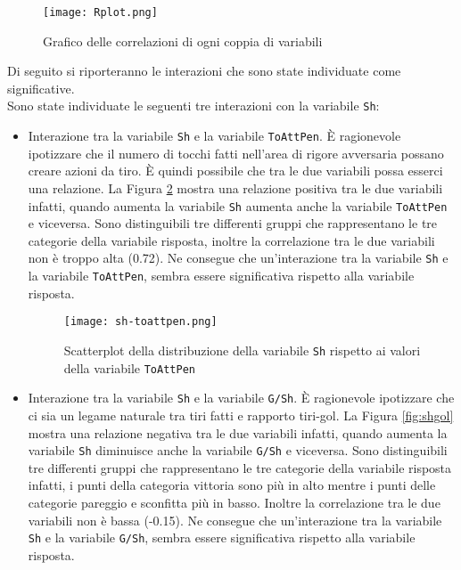\begin{figure}[htbp]
	\begin{center}
		\texttt{[image: Rplot.png]}
		\caption{Grafico delle correlazioni di ogni coppia di variabili}  \label{fig:cor}
	\end{center}
\end{figure}

Di seguito si riporteranno le interazioni che sono state individuate come significative.\\ 


Sono state individuate le seguenti tre interazioni con la variabile \texttt{Sh}:
\begin{itemize}
	\item Interazione tra la variabile \texttt{Sh} e la variabile \texttt{ToAttPen}. È ragionevole ipotizzare che il numero di tocchi fatti nell'area di rigore avversaria possano creare azioni da tiro. È quindi possibile che tra le due variabili possa esserci una relazione. La Figura \ref{fig:shpen} mostra una relazione  positiva tra le due variabili infatti, quando aumenta la variabile \texttt{Sh} aumenta anche la variabile \texttt{ToAttPen} e viceversa. Sono distinguibili tre differenti gruppi che rappresentano le tre categorie della variabile risposta, inoltre la correlazione tra le due variabili non è troppo alta (0.72). Ne consegue che un'interazione tra la variabile \texttt{Sh} e la variabile \texttt{ToAttPen}, sembra essere significativa rispetto alla variabile risposta.
	\begin{figure}[htbp]
		\begin{center}
			\texttt{[image: sh-toattpen.png]}
			\caption{Scatterplot della distribuzione della variabile \texttt{Sh} rispetto ai valori della variabile \texttt{ToAttPen}}  \label{fig:shpen}
		\end{center}
	\end{figure}

\item Interazione tra la variabile \texttt{Sh} e la variabile \texttt{G/Sh}. È ragionevole ipotizzare che ci sia un legame naturale tra tiri fatti e rapporto tiri-gol. La Figura \ref{fig:shgol} mostra una relazione negativa tra le due variabili infatti, quando aumenta la variabile \texttt{Sh} diminuisce anche la variabile \texttt{G/Sh} e viceversa. Sono distinguibili tre differenti gruppi che rappresentano le tre categorie della variabile risposta infatti, i punti della categoria vittoria sono più in alto mentre i punti delle categorie pareggio e sconfitta più in basso. Inoltre la correlazione tra le due variabili non è bassa (-0.15). Ne consegue che un'interazione tra la variabile \texttt{Sh} e la variabile \texttt{G/Sh}, sembra essere significativa rispetto alla variabile risposta.


\end{itemize}
